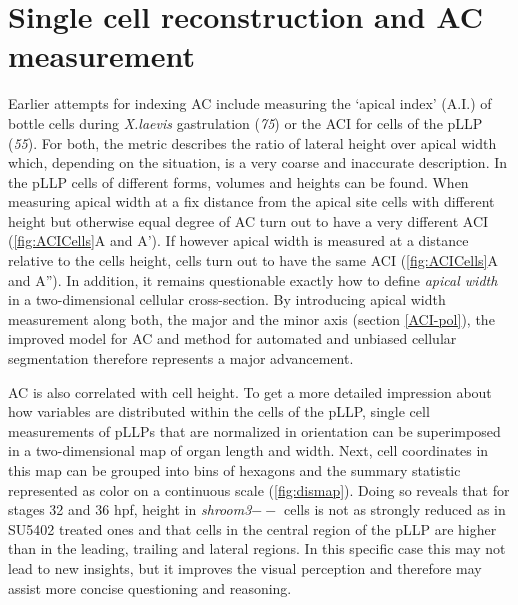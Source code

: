 \documentclass[11pt,singlespacinge,twoside]{reedthesis} %
\begin{document}
\hypertarget{single-cell-reconstruction-and-ac-measurement}{%
\section{Single cell reconstruction and AC measurement}\label{single-cell-reconstruction-and-ac-measurement}}

Earlier attempts for indexing AC include measuring the `apical index' (A.I.) of bottle cells during \emph{X.laevis} gastrulation (\emph{75}) or the ACI for cells of the pLLP (\emph{55}). For both, the metric describes the ratio of lateral height over apical width which, depending on the situation, is a very coarse and inaccurate description. In the pLLP cells of different forms, volumes and heights can be found. When measuring apical width at a fix distance from the apical site cells with different height but otherwise equal degree of AC turn out to have a very different ACI (\ref{fig:ACICells}A and A'). If however apical width is measured at a distance relative to the cells height, cells turn out to have the same ACI (\ref{fig:ACICells}A and A''). In addition, it remains questionable exactly how to define \emph{apical width} in a two-dimensional cellular cross-section. By introducing apical width measurement along both, the major and the minor axis (section \ref{ACI-pol}), the improved model for AC and method for automated and unbiased cellular segmentation therefore represents a major advancement.

AC is also correlated with cell height. To get a more detailed impression about how variables are distributed within the cells of the pLLP, single cell measurements of pLLPs that are normalized in orientation can be superimposed in a two-dimensional map of organ length and width. Next, cell coordinates in this map can be grouped into bins of hexagons and the summary statistic represented as color on a continuous scale (\ref{fig:dismap}). Doing so reveals that for stages 32 and 36 hpf, height in \emph{shroom3}\(--\) cells is not as strongly reduced as in SU5402 treated ones and that cells in the central region of the pLLP are higher than in the leading, trailing and lateral regions. In this specific case this may not lead to new insights, but it improves the visual perception and therefore may assist more concise questioning and reasoning.
\end{document}
